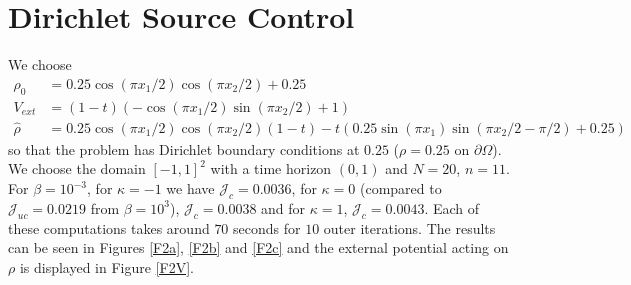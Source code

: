 \documentclass[11pt, a4paper]{article}
\theoremstyle{definition}
\newcommand{\hr}{\widehat \rho}
\begin{document}
	\section*{Dirichlet Source Control}
	We choose 
	\begin{align*}
		\rho_0 &= 0.25\cos(\pi x_1/2)\cos(\pi x_2/2) + 0.25\\
		V_{ext} &=  (1-t)(-\cos(\pi x_1/2)\sin(\pi x_2/2) + 1)\\
		\hr &= 0.25\cos(\pi x_1/2)\cos(\pi x_2/2)(1 - t) - t(0.25\sin(\pi x_1)\sin(\pi x_2/2 - \pi/2) + 0.25)
	\end{align*}
	so that the problem has Dirichlet boundary conditions at $0.25$ ($\rho = 0.25$ on $\partial \Omega$).
	We choose the domain $[-1,1]^2$ with a time horizon $(0,1)$ and $N = 20$, $n = 11$.
	For $\beta = 10^{-3}$, for $\kappa = -1$ we have $\mathcal J_c = 0.0036$, for $\kappa = 0$ (compared to $\mathcal J_{uc} = 0.0219$ from $\beta = 10^3$), $\mathcal J_c = 0.0038$ and for $\kappa = 1$, $\mathcal J_c = 0.0043$. Each of these computations takes around $70$ seconds for $10$ outer iterations. The results can be seen in Figures \ref{F2a}, \ref{F2b} and \ref{F2c} and the external potential acting on $\rho$ is displayed in Figure \ref{F2V}.\\
	
\end{document}
